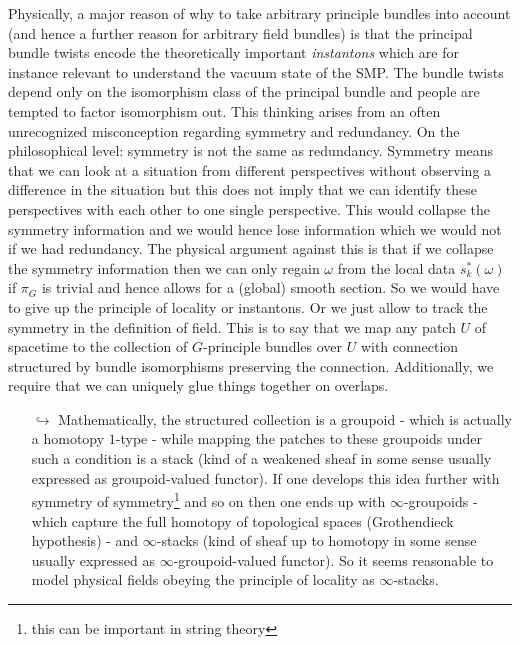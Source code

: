 \begin{enumerate}
\begin{enumerate}
\end{enumerate}
Physically, a major reason of why to take arbitrary principle bundles into account (and hence a further reason for arbitrary field bundles) is that the principal bundle twists encode the theoretically important \textit{instantons} which are for instance relevant to understand the vacuum state of the SMP. The bundle twists depend only on the isomorphism class of the principal bundle and people are tempted to factor isomorphism out. This thinking arises from an often unrecognized misconception regarding symmetry and redundancy. On the philosophical level: symmetry is not the same as redundancy. Symmetry means that we can look at a situation from different perspectives without observing a difference in the situation but this does not imply that we can identify these perspectives with each other to one single perspective. This would collapse the symmetry information and we would hence lose information which we would not if we had redundancy. The physical argument against this is that if we collapse the symmetry information then we can only regain $\omega$ from the local data $s_{k}^{\ast}(\omega)$ if $\pi_{G}$ is trivial and hence allows for a (global) smooth section. So we would have to give up the principle of locality or instantons. Or we just allow to track the symmetry in the definition of field. This is to say that we map any patch $U$ of spacetime to the collection of $G$-principle bundles over $U$ with connection structured by bundle isomorphisms preserving the connection. Additionally, we require that we can uniquely glue things together on overlaps.
\begin{enumerate}
\item[$\pmb{\hookrightarrow}$]
Mathematically, the structured collection is a groupoid - which is actually a homotopy $1$-type - while mapping the patches to these groupoids under such a condition is a stack (kind of a weakened sheaf in some sense usually expressed as groupoid-valued functor). If one develops this idea further with symmetry of symmetry\footnote{this can be important in string theory} and so on then one ends up with $\infty$-groupoids - which capture the full homotopy of topological spaces (Grothendieck hypothesis) - and $\infty$-stacks (kind of sheaf up to homotopy in some sense usually expressed as $\infty$-groupoid-valued functor). So it seems reasonable to model physical fields obeying the principle of locality as $\infty$-stacks.
\end{enumerate}

\end{enumerate}
